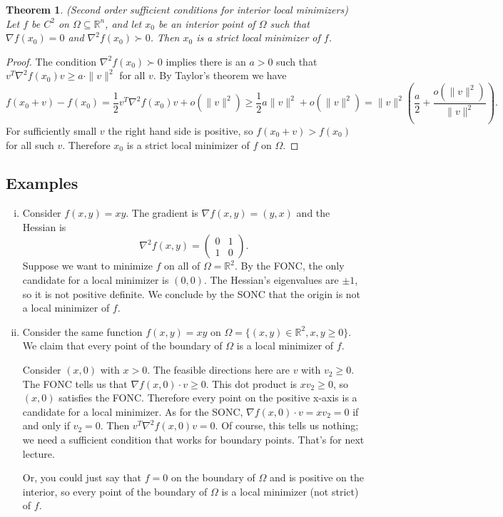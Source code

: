 \documentclass[11pt]{book}
\newcommand{\R}{\mathbb{R}}
\newtheorem{theorem}{Theorem}[subsection]
\begin{document}
\begin{theorem}
(Second order sufficient conditions for interior local minimizers) Let $f$ be $C^2$ on $\Omega \subseteq \R^n$, and let $x_0$ be an interior point of $\Omega$ such that $\nabla f(x_0) = 0$ and $\nabla^2 f(x_0) \succ 0$. Then $x_0$ is a strict local minimizer of $f$.
\end{theorem}
\begin{proof}
The condition $\nabla^2 f(x_0) \succ 0$ implies there is an $a > 0$ such that $v^T \nabla^2 f(x_0) v \geq a \cdot \|v\|^2$ for all $v$. By Taylor's theorem we have
\[
f(x_0 + v) - f(x_0) = \frac{1}{2} v^T \nabla^2 f(x_0) v + o(\|v\|^2) \geq \frac{1}{2} a\|v\|^2 + o(\|v\|^2) = \|v\|^2 \left( \frac{a}{2} + \frac{o(\|v\|^2)}{\|v\|^2} \right).
\]
For sufficiently small $v$ the right hand side is positive, so $f(x_0 + v) > f(x_0)$ for all such $v$. Therefore $x_0$ is a strict local minimizer of $f$ on $\Omega$.
\end{proof}

\subsection{Examples}
\begin{enumerate}[(i)]
\item 
Consider $f(x,y) = xy$. The gradient is $\nabla f(x,y) = (y,x)$ and the Hessian is 
\[
\nabla^2 f(x,y) = \begin{pmatrix}
0 & 1 \\ 1 & 0
\end{pmatrix}.
\]
Suppose we want to minimize $f$ on all of $\Omega = \R^2$. By the FONC, the only candidate for a local minimizer is $(0,0)$. The Hessian's eigenvalues are $\pm 1$, so it is not positive definite. We conclude by the SONC that the origin is not a local minimizer of $f$.

\item 
Consider the same function $f(x,y) = xy$ on $\Omega = \{(x,y) \in \R^2, x, y \geq 0\}$. We claim that every point of the boundary of $\Omega$ is a local minimizer of $f$.

Consider $(x,0)$ with $x > 0$. The feasible directions here are $v$ with $v_2 \geq 0$. The FONC tells us that $\nabla f(x,0) \cdot v\geq 0$. This dot product is $xv_2 \geq 0$, so $(x,0)$ satisfies the FONC. Therefore every point on the positive x-axis is a candidate for a local minimizer. As for the SONC, $\nabla f(x,0) \cdot v = xv_2 = 0$ if and only if $v_2 = 0$. Then $v^T \nabla^2 f(x,0) v = 0$. Of course, this tells us nothing; we need a sufficient condition that works for boundary points. That's for next lecture.

Or, you could just say that $f = 0$ on the boundary of $\Omega$ and is positive on the interior, so every point of the boundary of $\Omega$ is a local minimizer (not strict) of $f$.

\end{enumerate}
\end{document}
